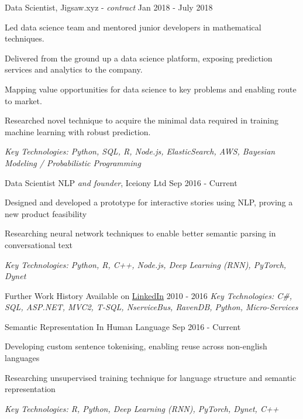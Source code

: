 \documentclass[11pt,article,oneside]{memoir}
\newenvironment{itemize*}{%
  \renewcommand\labelitemi{\textbullet}
  \footnotesize
  \begin{itemize}%
    \setlength{\itemsep}{0pt}}%
  {\end{itemize}
}
\begin{document}
\normalsize
\medskip
\ind Data Scientist, Jigsaw.xyz - \emph{contract} \hfill Jan 2018 - July 2018
\begin{itemize*}
  \item Led data science team and mentored junior developers in mathematical techniques.
  \item Delivered from the ground up a data science platform, exposing prediction services and analytics to the company.
  \item Mapping value opportunities for data science to key problems and enabling route to market.
  \item Researched novel technique to acquire the minimal data required in training machine learning with robust prediction.  
\end{itemize*}
\ind \hspace{0.35in} \footnotesize \emph{Key Technologies: Python, SQL, R, Node.js, ElasticSearch, AWS, Bayesian Modeling / Probabilistic Programming}

\newpage

\normalsize
\medskip
\ind Data Scientist NLP \emph{and founder}, Iceiony Ltd \hfill Sep 2016 - Current
\begin{itemize*}
  \item Designed and developed a prototype for interactive stories using NLP, proving a new product feasibility 
  \item Researching neural network techniques to enable better semantic parsing in conversational text 
\end{itemize*}
\ind \hspace{0.35in} \footnotesize \emph{Key Technologies: Python, R, C++, Node.js, Deep Learning (RNN), PyTorch, Dynet}

\normalsize
\medskip
\ind Further Work History Available on \href{https://uk.linkedin.com/in/adrian-ionita-6a923129}{LinkedIn} \hfill 2010 - 2016
\linebreak
\ind \hspace{0.35in} \footnotesize \emph{Key Technologies: C\#, SQL, ASP.NET, MVC2, T-SQL, NserviceBus, RavenDB, Python, Micro-Services}


\normalsize
\medskip
\ind Semantic Representation In Human Language \hfill Sep 2016 - Current
\begin{itemize*}
  \item Developing custom sentence tokenising, enabling reuse across non-english languages
  \item Researching unsupervised training technique for language structure and semantic representation
\end{itemize*}
\ind \hspace{0.35in} \footnotesize \emph{Key Technologies: R, Python, Deep Learning (RNN), PyTorch, Dynet, C++}
\end{document}

